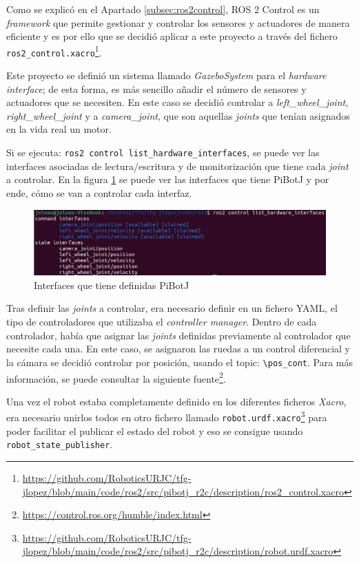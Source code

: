 Como se explicó en el Apartado \ref{subsec:ros2control}, ROS 2 Control es un \textit{framework} que permite gestionar y controlar los sensores y actuadores de manera eficiente y es por ello que se decidió aplicar a este proyecto a través del fichero \verb|ros2_control.xacro|\footnote{\url{https://github.com/RoboticsURJC/tfg-jlopez/blob/main/code/ros2/src/pibotj_r2c/description/ros2_control.xacro}}.

Este proyecto se definió un sistema llamado \textit{GazeboSystem} para el \textit{hardware interface}; de esta forma, es más sencillo añadir el número de sensores y actuadores que se necesiten. En este caso se decidió controlar a \textit{left\_wheel\_joint}, \textit{right\_wheel\_joint} y a \textit{camera\_joint}, que son aquellas \textit{joints} que tenían asignados en la vida real un motor. 

Si se ejecuta: \verb|ros2 control list_hardware_interfaces|, se puede ver las interfaces asociadas de lectura/escritura y de monitorización que tiene cada \textit{joint} a controlar. En la figura \ref{fig:ros2control} se puede ver las interfaces que tiene PiBotJ y por ende, cómo se van a controlar cada interfaz.

 \begin{figure} [h!]
 	\begin{center}
 		\includegraphics[width=14cm]{figs/cap6/interfaces.png}
 	\end{center}
 	\caption{Interfaces que tiene definidas PiBotJ}
 	\label{fig:ros2control}
 \end{figure}

Tras definir las \textit{joints} a controlar, era necesario definir en un fichero YAML, el tipo de controladores que utilizaba el \textit{controller manager}. Dentro de cada controlador, había que asignar las \textit{joints} definidas previamente al controlador que necesite cada una. En este caso, se asignaron las ruedas a un control diferencial y la cámara se decidió controlar por posición, usando el topic: \verb|\pos_cont|. Para más información, se puede consultar la siguiente fuente\footnote{\url{https://control.ros.org/humble/index.html}}.

Una vez el robot estaba completamente definido en los diferentes ficheros \textit{Xacro}, era necesario unirlos todos en otro fichero llamado \verb|robot.urdf.xacro|\footnote{\url{https://github.com/RoboticsURJC/tfg-jlopez/blob/main/code/ros2/src/pibotj_r2c/description/robot.urdf.xacro}} para poder facilitar el publicar el estado del robot y eso se consigue usando \verb|robot_state_publisher|.
 
